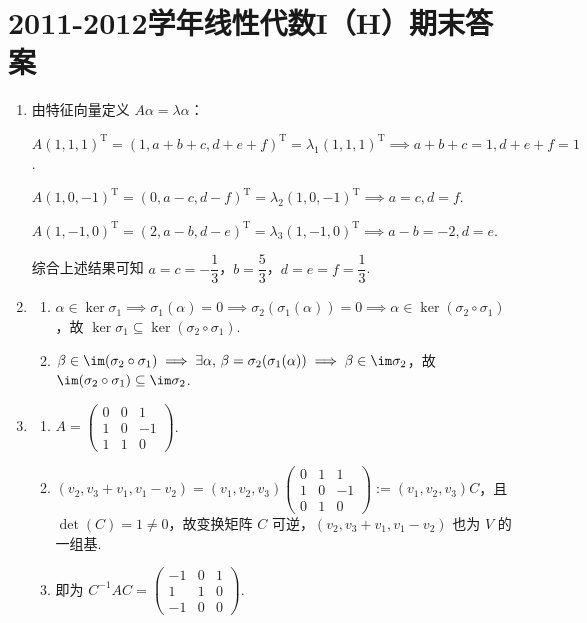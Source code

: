 \section{2011-2012学年线性代数I（H）期末答案}

\begin{enumerate}
    \item 由特征向量定义 $A\alpha = \lambda \alpha$：

    $A(1,1,1)^\mathrm{T}=(1,a+b+c,d+e+f)^\mathrm{T}=\lambda_1(1,1,1)^\mathrm{T}\implies a+b+c=1,d+e+f=1$.

    $A(1,0,-1)^\mathrm{T}=(0, a-c, d-f)^\mathrm{T}=\lambda_2(1,0,-1)^\mathrm{T}\implies a=c, d=f$.

    $A(1,-1,0)^\mathrm{T}=(2, a-b, d-e)^\mathrm{T}=\lambda_3(1,-1,0)^\mathrm{T}\implies a-b=-2, d=e$.

    综合上述结果可知 $a=c=-\dfrac{1}{3}$，$b=\dfrac{5}{3}$，$d=e=f=\dfrac{1}{3}$.

    \item
    \begin{enumerate}
        \item $\alpha \in \ker \sigma_1 \implies \sigma_1(\alpha)=0 \implies \sigma_2(\sigma_1(\alpha))=0 \implies \alpha \in \ker(\sigma_2\circ\sigma_1)$，故 $\ker \sigma_1 \subseteq \ker(\sigma_2\circ\sigma_1)$.
        \item $\beta \in \im(\sigma_2\circ\sigma_1) \implies \exists \alpha,\, \beta = \sigma_2(\sigma_1(\alpha)) \implies \beta \in \im \sigma_2$，故 $\im(\sigma_2\circ\sigma_1) \subseteq \im \sigma_2$.
    \end{enumerate}

    \item
    \begin{enumerate}
        \item $A = \begin{pmatrix} 0 & 0 & 1 \\ 1 & 0 & -1 \\ 1 & 1 & 0 \end{pmatrix}$.
        \item $(v_2,v_3+v_1,v_1-v_2)=(v_1,v_2,v_3)\begin{pmatrix}
            0 & 1 & 1 \\
            1 & 0 & -1 \\
            0 & 1 & 0
        \end{pmatrix}:=(v_1,v_2,v_3)C$，且 $\det(C)=1 \neq 0$，故变换矩阵 $C$ 可逆，$(v_2,v_3+v_1,v_1-v_2)$ 也为 $V$ 的一组基.
        \item 即为 $C^{-1}AC = \begin{pmatrix}
            -1 & 0 & 1 \\
            1 & 1 & 0 \\
            -1 & 0 & 0
        \end{pmatrix}$.
    \end{enumerate}


\end{enumerate}
